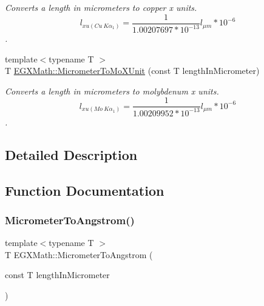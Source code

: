 \begin{DoxyCompactItemize}
\begin{DoxyCompactList}\small\item\em Converts a length in micrometers to copper x units. \[ l_{xu(Cu\ K\alpha_1)}= \frac{1}{1.00207697*10^{-13}} l_{\mu m} * 10^{-6}\]. \end{DoxyCompactList}\item 
{\footnotesize template$<$typename T $>$ }\\T \mbox{\hyperlink{group___e_g_x_math-_conversions-_length_conversions-_s_i-_micrometer-_non-_s_i_ga2ed475ce56e23d7783d6925f5b409f44}{E\+G\+X\+Math\+::\+Micrometer\+To\+Mo\+X\+Unit}} (const T length\+In\+Micrometer)
\begin{DoxyCompactList}\small\item\em Converts a length in micrometers to molybdenum x units. \[ l_{xu(Mo\ K\alpha_1)}=\frac{1}{1.00209952*10^{-13}} l_{\mu m} * 10^{-6}\]. \end{DoxyCompactList}\end{DoxyCompactItemize}


\subsection{Detailed Description}


\subsection{Function Documentation}
\mbox{\label{group___e_g_x_math-_conversions-_length_conversions-_s_i-_micrometer-_non-_s_i_ga4b7df35169682046455e9a6f99447777}} 
\subsubsection{\texorpdfstring{Micrometer\+To\+Angstrom()}{MicrometerToAngstrom()}}
{\footnotesize\ttfamily template$<$typename T $>$ \\
T E\+G\+X\+Math\+::\+Micrometer\+To\+Angstrom (\begin{DoxyParamCaption}\item[{const T}]{length\+In\+Micrometer }\end{DoxyParamCaption})}




